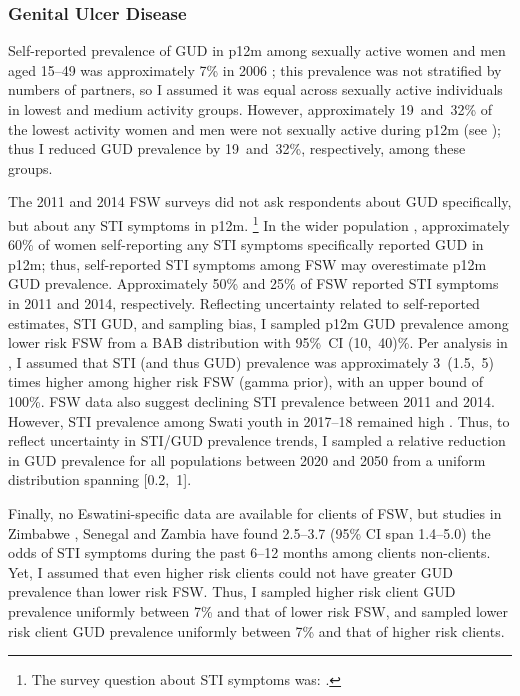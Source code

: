 \subsubsection{Genital Ulcer Disease}\label{model.par.tm.gud}
Self-reported prevalence of GUD in p12m among sexually active women and men aged 15--49
was approximately 7\% in 2006 \cite[Table~13.14]{SDHS2006};
this prevalence was not stratified by numbers of partners, so I assumed it was equal across
sexually active individuals in lowest and medium activity groups.
However, approximately 19~and~32\% of the lowest activity women and men
were not sexually active during p12m (see );
thus I reduced GUD prevalence by 19~and~32\%, respectively, among these groups.
\par
The 2011 and 2014 FSW surveys did not ask respondents about GUD specifically,
but about any STI symptoms in p12m.%
\footnote{The survey question about STI symptoms was:
  .}
In the wider population \cite{SDHS2006},
approximately 60\% of women self-reporting any STI symptoms specifically reported GUD in p12m;
thus, self-reported STI symptoms among FSW may overestimate p12m GUD prevalence.
Approximately 50\% and 25\% of FSW reported STI symptoms in 2011 and 2014, respectively.
Reflecting uncertainty related to self-reported estimates, STI \vs GUD, and sampling bias,
I sampled p12m GUD prevalence among lower risk FSW from
a BAB distribution with 95\%~CI (10,~40)\%.
Per analysis in , I assumed that STI (and thus GUD) prevalence was
approximately 3~(1.5,~5) times higher among higher risk FSW (gamma prior),
with an upper bound of 100\%.
FSW data also suggest declining STI prevalence between 2011 and 2014.
However, STI prevalence among Swati youth in 2017--18 remained high \cite{Jasumback2020}.
Thus, to reflect uncertainty in STI/GUD prevalence trends,
I sampled a relative reduction in GUD prevalence for all populations between 2020 and 2050
from a uniform distribution spanning [0.2,~1].
\par
Finally, no Eswatini-specific data are available for clients of FSW,
but studies in Zimbabwe \cite{Cowan2005}, Senegal \cite{Santo2005} and Zambia \cite{Carrasco2020}
have found 2.5--3.7 (95\% CI span 1.4--5.0) the odds
of STI symptoms during the past 6--12 months among clients \vs non-clients.
Yet, I assumed that even higher risk clients
could not have greater GUD prevalence than lower risk FSW.
Thus, I sampled higher risk client GUD prevalence uniformly between 7\% and that of lower risk FSW,
and sampled lower risk client GUD prevalence uniformly between 7\% and that of higher risk clients.